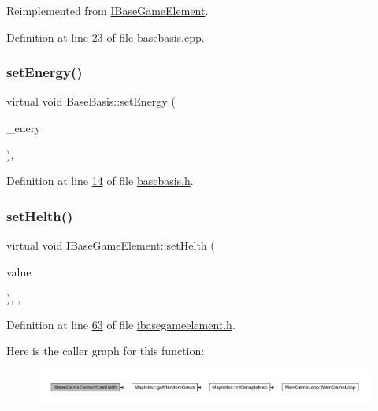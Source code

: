Reimplemented from \hyperlink{a00137_a71d8528482d5be16100ad56dbfd4aae9}{I\+Base\+Game\+Element}.



Definition at line \hyperlink{a00026_source_l00023}{23} of file \hyperlink{a00026_source}{basebasis.\+cpp}.

\mbox{\label{a00149_a8f4de08926ac9bf0968af49f1ac1279e}} 
\subsubsection{\texorpdfstring{set\+Energy()}{setEnergy()}}
{\footnotesize\ttfamily virtual void Base\+Basis\+::set\+Energy (\begin{DoxyParamCaption}\item[{int}]{\+\_\+enery }\end{DoxyParamCaption})\hspace{0.3cm}{\ttfamily [inline]}, {\ttfamily [virtual]}}



Definition at line \hyperlink{a00029_source_l00014}{14} of file \hyperlink{a00029_source}{basebasis.\+h}.

\mbox{\label{a00137_a2f95e7a61b5db7f2fbbfd32ff786f58c}} 
\subsubsection{\texorpdfstring{set\+Helth()}{setHelth()}}
{\footnotesize\ttfamily virtual void I\+Base\+Game\+Element\+::set\+Helth (\begin{DoxyParamCaption}\item[{\hyperlink{a00161}{Infinity\+Double} $\ast$}]{value }\end{DoxyParamCaption})\hspace{0.3cm}{\ttfamily [inline]}, {\ttfamily [virtual]}, {\ttfamily [inherited]}}



Definition at line \hyperlink{a00047_source_l00063}{63} of file \hyperlink{a00047_source}{ibasegameelement.\+h}.

Here is the caller graph for this function\+:
\nopagebreak
\begin{figure}[H]
\begin{center}
\leavevmode
\includegraphics[width=350pt]{d2/df5/a00137_a2f95e7a61b5db7f2fbbfd32ff786f58c_icgraph}
\end{center}
\end{figure}
\mbox{\label{a00137_a874f246d3249a989750e3db85ea4bfcd}} 
